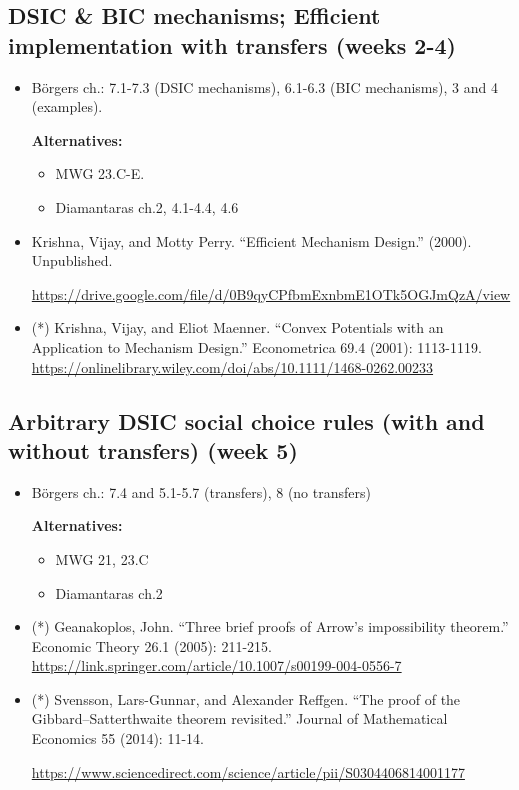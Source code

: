 \documentclass{article}
\begin{document}
\subsection{DSIC \& BIC mechanisms; Efficient implementation with transfers (weeks 2-4)}
\begin{itemize}
	\item B{\"o}rgers ch.: 7.1-7.3 (DSIC mechanisms), 6.1-6.3 (BIC mechanisms), 3 and 4 (examples).
	
	\textbf{Alternatives:}
	\begin{itemize}
		\item MWG 23.C-E.
		\item Diamantaras ch.2, 4.1-4.4, 4.6
	\end{itemize}
	\item Krishna, Vijay, and Motty Perry. ``Efficient Mechanism Design.'' (2000). Unpublished.
	
	\url{https://drive.google.com/file/d/0B9qyCPfbmExnbmE1OTk5OGJmQzA/view}
	
	\item (*) Krishna, Vijay, and Eliot Maenner. ``Convex Potentials with an Application to Mechanism Design.'' Econometrica 69.4 (2001): 1113-1119.\\
	\url{https://onlinelibrary.wiley.com/doi/abs/10.1111/1468-0262.00233}
\end{itemize}

\subsection{Arbitrary DSIC social choice rules (with and without transfers) (week 5)}
\begin{itemize}
	\item B{\"o}rgers ch.: 7.4 and 5.1-5.7 (transfers), 8 (no transfers)
	
	\textbf{Alternatives:}
	\begin{itemize}
		\item MWG 21, 23.C
		\item Diamantaras ch.2
	\end{itemize}
	\item (*) Geanakoplos, John. ``Three brief proofs of Arrow’s impossibility theorem.'' Economic Theory 26.1 (2005): 211-215. \url{https://link.springer.com/article/10.1007/s00199-004-0556-7}
	\item (*) Svensson, Lars-Gunnar, and Alexander Reffgen. ``The proof of the Gibbard–Satterthwaite theorem revisited.'' Journal of Mathematical Economics 55 (2014): 11-14.
	
	\url{https://www.sciencedirect.com/science/article/pii/S0304406814001177}
\end{itemize}
\end{document}
